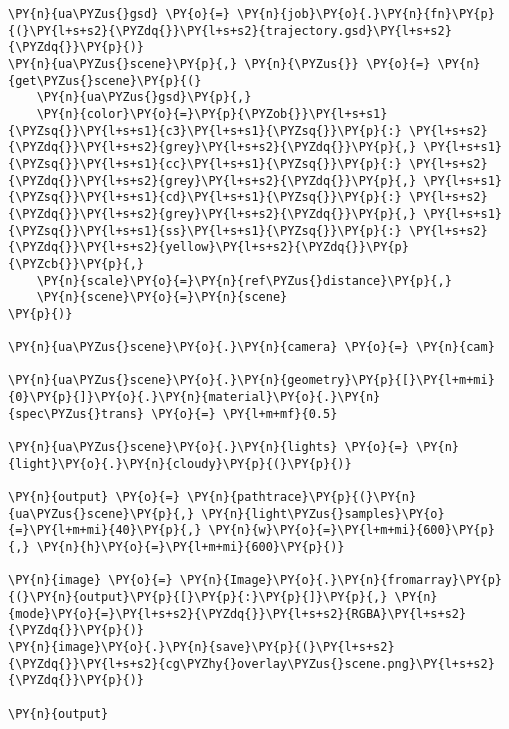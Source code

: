     \begin{tcolorbox}[breakable, size=fbox, boxrule=1pt, pad at break*=1mm,colback=cellbackground, colframe=cellborder]
\begin{Verbatim}[commandchars=\\\{\}]
\PY{n}{ua\PYZus{}gsd} \PY{o}{=} \PY{n}{job}\PY{o}{.}\PY{n}{fn}\PY{p}{(}\PY{l+s+s2}{\PYZdq{}}\PY{l+s+s2}{trajectory.gsd}\PY{l+s+s2}{\PYZdq{}}\PY{p}{)}
\PY{n}{ua\PYZus{}scene}\PY{p}{,} \PY{n}{\PYZus{}} \PY{o}{=} \PY{n}{get\PYZus{}scene}\PY{p}{(}
    \PY{n}{ua\PYZus{}gsd}\PY{p}{,} 
    \PY{n}{color}\PY{o}{=}\PY{p}{\PYZob{}}\PY{l+s+s1}{\PYZsq{}}\PY{l+s+s1}{c3}\PY{l+s+s1}{\PYZsq{}}\PY{p}{:} \PY{l+s+s2}{\PYZdq{}}\PY{l+s+s2}{grey}\PY{l+s+s2}{\PYZdq{}}\PY{p}{,} \PY{l+s+s1}{\PYZsq{}}\PY{l+s+s1}{cc}\PY{l+s+s1}{\PYZsq{}}\PY{p}{:} \PY{l+s+s2}{\PYZdq{}}\PY{l+s+s2}{grey}\PY{l+s+s2}{\PYZdq{}}\PY{p}{,} \PY{l+s+s1}{\PYZsq{}}\PY{l+s+s1}{cd}\PY{l+s+s1}{\PYZsq{}}\PY{p}{:} \PY{l+s+s2}{\PYZdq{}}\PY{l+s+s2}{grey}\PY{l+s+s2}{\PYZdq{}}\PY{p}{,} \PY{l+s+s1}{\PYZsq{}}\PY{l+s+s1}{ss}\PY{l+s+s1}{\PYZsq{}}\PY{p}{:} \PY{l+s+s2}{\PYZdq{}}\PY{l+s+s2}{yellow}\PY{l+s+s2}{\PYZdq{}}\PY{p}{\PYZcb{}}\PY{p}{,} 
    \PY{n}{scale}\PY{o}{=}\PY{n}{ref\PYZus{}distance}\PY{p}{,}
    \PY{n}{scene}\PY{o}{=}\PY{n}{scene}
\PY{p}{)}

\PY{n}{ua\PYZus{}scene}\PY{o}{.}\PY{n}{camera} \PY{o}{=} \PY{n}{cam}

\PY{n}{ua\PYZus{}scene}\PY{o}{.}\PY{n}{geometry}\PY{p}{[}\PY{l+m+mi}{0}\PY{p}{]}\PY{o}{.}\PY{n}{material}\PY{o}{.}\PY{n}{spec\PYZus{}trans} \PY{o}{=} \PY{l+m+mf}{0.5}

\PY{n}{ua\PYZus{}scene}\PY{o}{.}\PY{n}{lights} \PY{o}{=} \PY{n}{light}\PY{o}{.}\PY{n}{cloudy}\PY{p}{(}\PY{p}{)}

\PY{n}{output} \PY{o}{=} \PY{n}{pathtrace}\PY{p}{(}\PY{n}{ua\PYZus{}scene}\PY{p}{,} \PY{n}{light\PYZus{}samples}\PY{o}{=}\PY{l+m+mi}{40}\PY{p}{,} \PY{n}{w}\PY{o}{=}\PY{l+m+mi}{600}\PY{p}{,} \PY{n}{h}\PY{o}{=}\PY{l+m+mi}{600}\PY{p}{)}

\PY{n}{image} \PY{o}{=} \PY{n}{Image}\PY{o}{.}\PY{n}{fromarray}\PY{p}{(}\PY{n}{output}\PY{p}{[}\PY{p}{:}\PY{p}{]}\PY{p}{,} \PY{n}{mode}\PY{o}{=}\PY{l+s+s2}{\PYZdq{}}\PY{l+s+s2}{RGBA}\PY{l+s+s2}{\PYZdq{}}\PY{p}{)}
\PY{n}{image}\PY{o}{.}\PY{n}{save}\PY{p}{(}\PY{l+s+s2}{\PYZdq{}}\PY{l+s+s2}{cg\PYZhy{}overlay\PYZus{}scene.png}\PY{l+s+s2}{\PYZdq{}}\PY{p}{)}

\PY{n}{output}
\end{Verbatim}
\end{tcolorbox}
 
